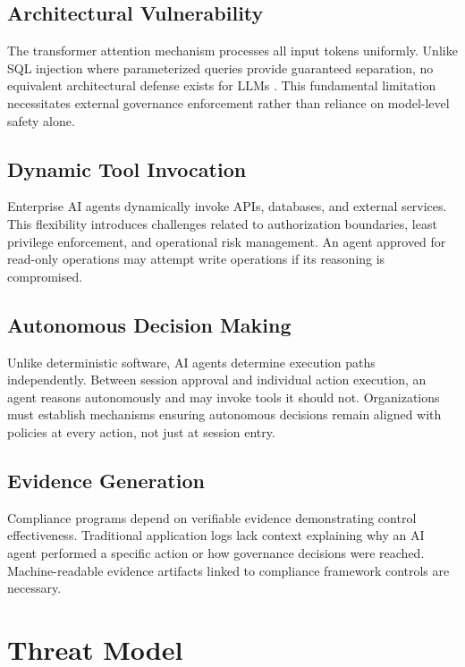 \documentclass[conference]{IEEEtran}
\begin{document}
\subsection{Architectural Vulnerability}

The transformer attention mechanism processes all input tokens uniformly. Unlike SQL injection where parameterized queries provide guaranteed separation, no equivalent architectural defense exists for LLMs \cite{b21}. This fundamental limitation necessitates external governance enforcement rather than reliance on model-level safety alone.

\subsection{Dynamic Tool Invocation}

Enterprise AI agents dynamically invoke APIs, databases, and external services. This flexibility introduces challenges related to authorization boundaries, least privilege enforcement, and operational risk management. An agent approved for read-only operations may attempt write operations if its reasoning is compromised.

\subsection{Autonomous Decision Making}

Unlike deterministic software, AI agents determine execution paths independently. Between session approval and individual action execution, an agent reasons autonomously and may invoke tools it should not. Organizations must establish mechanisms ensuring autonomous decisions remain aligned with policies at every action, not just at session entry.

\subsection{Evidence Generation}

Compliance programs depend on verifiable evidence demonstrating control effectiveness. Traditional application logs lack context explaining why an AI agent performed a specific action or how governance decisions were reached. Machine-readable evidence artifacts linked to compliance framework controls are necessary.

\section{Threat Model}
\end{document}
